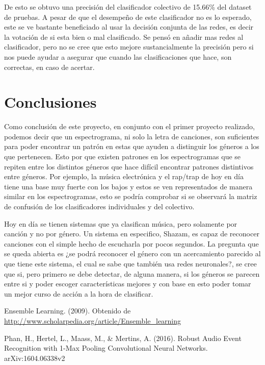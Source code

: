 \documentclass[spanish,11pt,letterpaper]{article}
\begin{document}
De esto se obtuvo una precisión del clasificador colectivo de 15.66\% del dataset de pruebas. A pesar de que el
desempeño de este clasificador no es lo esperado, este se ve bastante beneficiado al usar la decisión conjunta de
las redes, es decir la votación de si esta bien o mal clasificado. Se pensó en añadir mas redes al clasificador,
pero no se cree que esto mejore sustancialmente la precisión pero si nos puede ayudar a asegurar que cuando las
clasificaciones que hace, son correctas, en caso de acertar.

\section{Conclusiones}

Como conclusión de este proyecto, en conjunto con el primer proyecto realizado, podemos decir que un
espectrograma, ni solo la letra de canciones, son suficientes para poder encontrar un patrón en estas que ayuden a
distinguir los géneros a los que pertenecen. Esto por que existen patrones en los espectrogramas que se repiten
entre los distintos géneros que hace difícil encontrar patrones distintivos entre géneros. Por ejemplo, la música
electrónica y el rap/trap de hoy en día tiene una base muy fuerte con los bajos y estos se ven representados de
manera similar en los espectrogramas, esto se podría comprobar si se observará la matriz de confusión de los clasificadores individuales y del colectivo.

Hoy en día se tienen sistemas que ya clasifican música, pero solamente por canción y no por género. Un sistema en
especifico, Shazam, es capaz de reconocer canciones con el simple hecho de escucharla por pocos segundos. La
pregunta que se queda abierta es ¿se podrá reconocer el género con un acercamiento parecido al que tiene este
sistema, el cual se sabe que también usa redes neuronales?, se cree que si, pero primero se debe detectar, de
alguna manera, si los géneros se parecen entre si y poder escoger características mejores y con base en esto poder
tomar un mejor curso de acción a la hora de clasificar.

\begin{thebibliography}{9}
Ensemble Learning. (2009). Obtenido de
\url{http://www.scholarpedia.org/article/Ensemble_learning}

Phan, H., Hertel, L., Maass, M., \& Mertins, A. (2016).
Robust Audio Event Recognition with 1-Max Pooling Convolutional Neural Networks.
arXiv:1604.06338v2

\end{thebibliography}
\end{document}
